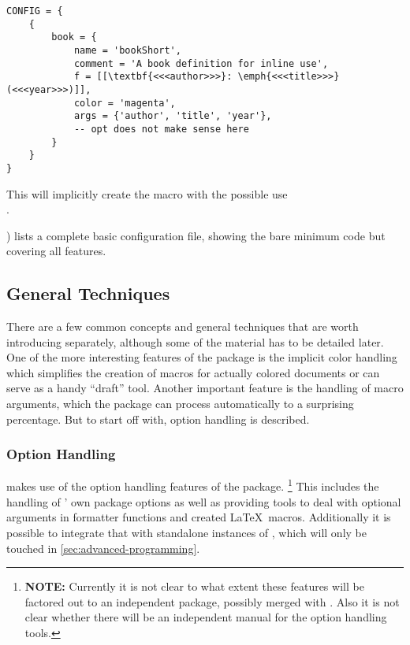 \documentclass{scrartcl}
\begin{document}
\label{code:bookShort}
\begin{verbatim}
CONFIG = {
    {
        book = {
            name = 'bookShort',
            comment = 'A book definition for inline use',
            f = [[\textbf{<<<author>>>}: \emph{<<<title>>>} (<<<year>>>)]],
            color = 'magenta',
            args = {'author', 'title', 'year'},
            -- opt does not make sense here
        }
    }
}
\end{verbatim}

\noindent
This will implicitly create the macro  with the possible
use\\
.

\medskip

) lists a complete basic configuration file,
showing the bare minimum code but covering all features.

\subsection{General Techniques}
\label{sec:general-techniques}

There are a few common concepts and general techniques that are worth introducing separately,
although some of the material has to be detailed later.  One of the more
interesting features of the  package is the implicit color
handling which simplifies the creation of macros for actually colored documents
or can serve as a handy “draft” tool.  Another important feature is the handling
of macro arguments, which the package can process automatically to a surprising
percentage.  But to start off with, option handling is described.


\subsubsection{Option Handling}
\label{sec:option-handling}

 makes use of the option handling features of the
 package.%
\footnote{\textbf{NOTE:} Currently it is not clear to what extent these features will
be factored out to an independent package, possibly merged with .
Also it is not clear whether there will be an independent manual for the option handling
tools.} %
This includes the handling of ' own package options as
well as providing tools to deal with optional arguments in formatter functions
and created \LaTeX\ macros.  Additionally it is possible to integrate that with
standalone instances of , which will only be touched in
\vref{sec:advanced-programming}.
\end{document}
